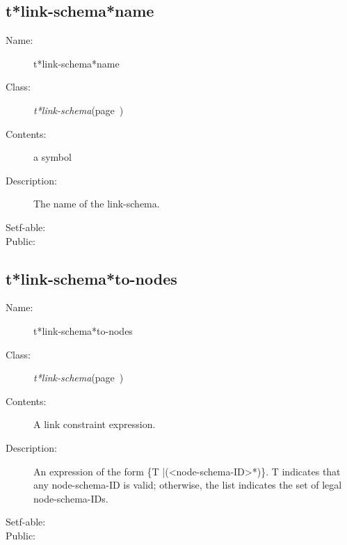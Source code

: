 \subsection{t*link-schema*name}
\label{t*link-schema*name}

\begin{description}
\item [Name:]  t*link-schema*name

\item [Class:] {\sl t*link-schema}\hfill(page~\pageref{t*link-schema})

\item [Contents:] a symbol

\item [Description:]

The name of the link-schema.

\item [Setf-able:]


\item [Public:]



\end{description}
\horizontalline

\subsection{t*link-schema*to-nodes}
\label{t*link-schema*to-nodes}

\begin{description}
\item [Name:]  t*link-schema*to-nodes

\item [Class:] {\sl t*link-schema}\hfill(page~\pageref{t*link-schema})

\item [Contents:] A link constraint expression.

\item [Description:]

An expression of the form \{T |(<node-schema-ID>*)\}.
T indicates that any node-schema-ID is valid; otherwise,
the list indicates the set of legal node-schema-IDs.

\item [Setf-able:]


\item [Public:]



\end{description}
\horizontalline

